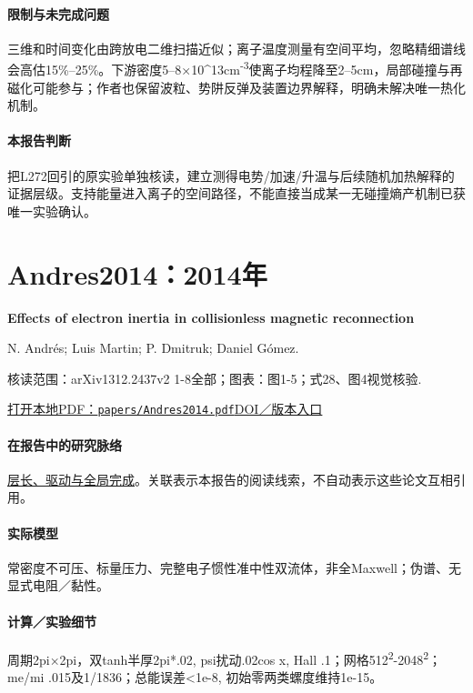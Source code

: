 \paragraph{限制与未完成问题}三维和时间变化由跨放电二维扫描近似；离子温度测量有空间平均，忽略精细谱线会高估15\%–25\%。下游密度5–8×10\textasciicircum{}13cm\textsuperscript{-3}使离子均程降至2–5cm，局部碰撞与再磁化可能参与；作者也保留波粒、势阱反弹及装置边界解释，明确未解决唯一热化机制。

\paragraph{本报告判断}把L272回引的原实验单独核读，建立测得电势/加速/升温与后续随机加热解释的证据层级。支持能量进入离子的空间路径，不能直接当成某一无碰撞熵产机制已获唯一实验确认。

\section{Andres2014：2014年}\label{paper:Andres2014}

\textbf{Effects of electron inertia in collisionless magnetic reconnection}\citep{Andres2014}\

N. Andrés;  Luis Martin;  P. Dmitruk;  Daniel Gómez.

\textsf{核读范围：}arXiv1312.2437v2 1-8全部；\textsf{图表：}图1-5；式28、图4视觉核验.

\href{run:papers/Andres2014.pdf}{打开本地PDF：\texttt{papers/Andres2014.pdf}}\quad\href{https://doi.org/10.1063/1.4890021}{DOI／版本入口}

\paragraph{在报告中的研究脉络}\hyperref[story:global]{层长、驱动与全局完成}。关联表示本报告的阅读线索，不自动表示这些论文互相引用。

\paragraph{实际模型}常密度不可压、标量压力、完整电子惯性准中性双流体，非全Maxwell；伪谱、无显式电阻／黏性。

\paragraph{计算／实验细节}周期2pi×2pi，双tanh半厚2pi*.02, psi扰动.02cos x, Hall .1；网格512\textsuperscript{2}-2048\textsuperscript{2}；me/mi .015及1/1836；总能误差<1e-8, 初始零两类螺度维持1e-15。

